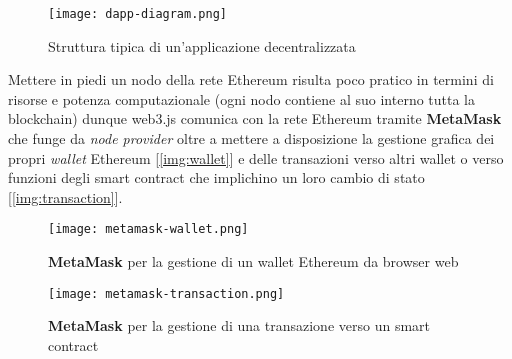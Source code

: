     \begin{figure}[h!]
        \centering
        \hspace*{-2cm}
        \texttt{[image: dapp-diagram.png]}
        \caption{Struttura tipica di un'applicazione decentralizzata}
    \end{figure}

    Mettere in piedi un nodo della rete Ethereum risulta poco pratico in termini di risorse e potenza computazionale (ogni nodo contiene al suo interno tutta la blockchain) dunque web3.js comunica con la rete Ethereum tramite \textbf{MetaMask} che funge da \textit{node provider} oltre a mettere a disposizione la gestione grafica dei propri \textit{wallet} Ethereum [\autoref{img:wallet}] e delle transazioni verso altri wallet o verso funzioni degli smart contract che implichino un loro cambio di stato [\autoref{img:transaction}].

    \begin{figure}[p]
        \centering
        \texttt{[image: metamask-wallet.png]}
        \caption{\textbf{MetaMask} per la gestione di un wallet Ethereum da browser web}
        \label{img:wallet}

        \centering
        \hspace*{-1cm}
        \texttt{[image: metamask-transaction.png]}
        \caption{\textbf{MetaMask} per la gestione di una transazione verso un smart contract}
        \label{img:transaction}
    \end{figure}


